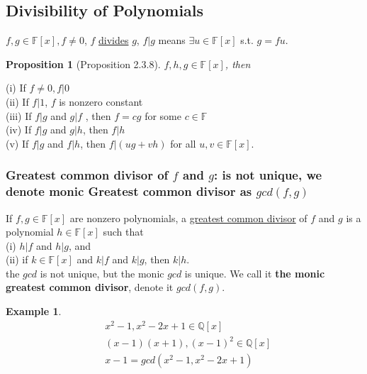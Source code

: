 \documentclass[11pt,a4paper]{article}
\newtheorem{proposition}{Proposition}
\newtheorem{example}{Example}
\begin{document}
\subsection{Divisibility of Polynomials}
$f,g\in\mathbb{F}[x], f\neq0$, $f$ \underline{divides} $g$, $f|g$ means $\exists u\in\mathbb{F}[x]$ s.t. $g=fu$.
\begin{proposition}[Proposition 2.3.8]
    $f , h, g \in \mathbb{F}[x]$, then
\end{proposition}
(i) If $f \neq 0, f |0$\\
(ii) If $f |1$, $f$ is nonzero constant\\
(iii) If $f |g$ and $g|f$ , then $f = cg$ for some $c \in \mathbb{F}$\\
(iv) If $f |g$ and $g|h$, then $f |h$\\
(v) If $f|g$ and $f|h$, then $f|(ug + vh)$ for all $u, v \in \mathbb{F}[x]$.\\


\subsubsection{Greatest common divisor of $f$ and $g$: is not unique, we denote monic Greatest common divisor as $gcd(f,g)$}
If $f, g \in \mathbb{F}[x]$ are nonzero polynomials, a \underline{greatest common divisor} of $f$ and $g$ is a polynomial $h \in \mathbb{F}[x]$ such that\\
(i) $h|f$ and $h|g$, and\\
(ii) if $k\in\mathbb{F}[x]$ and $k|f$ and $k|g$, then $k|h$.\\
the $gcd$ is not unique, but the monic $gcd$ is unique. We call it \textbf{the monic greatest common divisor}, denote it $gcd(f,g)$.
\begin{example}
\begin{equation}
    \begin{aligned}
        &x^2 - 1, x^2 - 2x + 1 \in \mathbb{Q}[x]\\
        &(x - 1)(x + 1), (x - 1)^2 \in \mathbb{Q}[x]\\
        &x -1 = gcd(x^2 - 1, x^2 - 2x + 1)
    \end{aligned}
    \nonumber
\end{equation}
\end{example}
\end{document}
